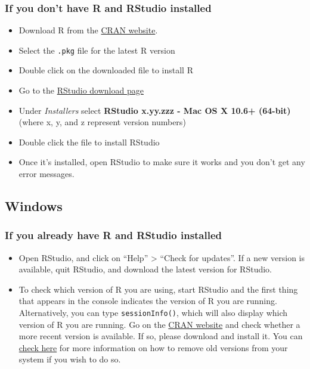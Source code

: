 \documentclass[]{book}
\providecommand{\tightlist}{%
  \setlength{\itemsep}{0pt}\setlength{\parskip}{0pt}}
\begin{document}
\subsubsection*{If you don't have R and RStudio
installed}\label{if-you-dont-have-r-and-rstudio-installed}

\begin{itemize}
\tightlist
\item
  Download R from the \href{http://cran.r-project.org/bin/macosx}{CRAN
  website}.
\item
  Select the \texttt{.pkg} file for the latest R version
\item
  Double click on the downloaded file to install R
\item
  Go to the
  \href{https://www.rstudio.com/products/rstudio/download/\#download}{RStudio
  download page}
\item
  Under \emph{Installers} select \textbf{RStudio x.yy.zzz - Mac OS X
  10.6+ (64-bit)} (where x, y, and z represent version numbers)
\item
  Double click the file to install RStudio
\item
  Once it's installed, open RStudio to make sure it works and you don't
  get any error messages.
\end{itemize}

\subsection*{Windows}\label{windows}

\subsubsection*{If you already have R and RStudio
installed}\label{if-you-already-have-r-and-rstudio-installed-1}

\begin{itemize}
\tightlist
\item
  Open RStudio, and click on ``Help'' \textgreater{} ``Check for
  updates''. If a new version is available, quit RStudio, and download
  the latest version for RStudio.
\item
  To check which version of R you are using, start RStudio and the first
  thing that appears in the console indicates the version of R you are
  running. Alternatively, you can type \texttt{sessionInfo()}, which
  will also display which version of R you are running. Go on the
  \href{https://cran.r-project.org/bin/windows/base/}{CRAN website} and
  check whether a more recent version is available. If so, please
  download and install it. You can
  \href{https://cran.r-project.org/bin/windows/base/rw-FAQ.html\#How-do-I-UNinstall-R_003f}{check
  here} for more information on how to remove old versions from your
  system if you wish to do so.
\end{itemize}
\end{document}

